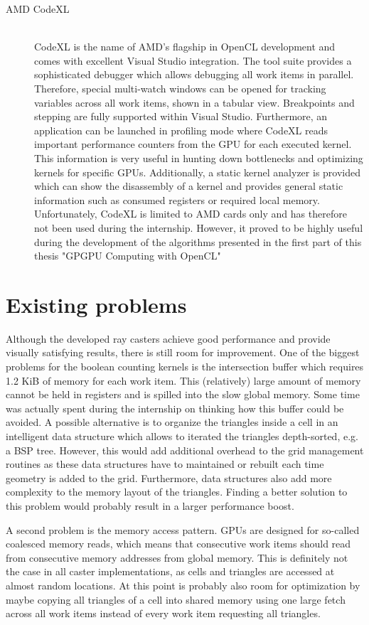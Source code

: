 \begin{description}
\item[AMD CodeXL] \hfill \\
CodeXL is the name of AMD's flagship in OpenCL development and comes with excellent Visual Studio integration. The tool suite provides a sophisticated debugger which allows debugging all work items in parallel. Therefore, special multi-watch windows can be opened for tracking variables across all work items, shown in a tabular view. Breakpoints and stepping are fully supported within Visual Studio. Furthermore, an application can be launched in profiling mode where CodeXL reads important performance counters from the GPU for each executed kernel. This information is very useful in hunting down bottlenecks and optimizing kernels for specific GPUs. Additionally, a static kernel analyzer is provided which can show the disassembly of a kernel and provides general static information such as consumed registers or required local memory. Unfortunately, CodeXL is limited to AMD cards only and has therefore not been used during the internship. However, it proved to be highly useful during the development of the algorithms presented in the first part of this thesis "GPGPU Computing with OpenCL"
\end{description}

\section{Existing problems}

Although the developed ray casters achieve good performance and provide visually satisfying results, there is still room for improvement. One of the biggest problems for the boolean counting kernels is the intersection buffer which requires 1.2 KiB of memory for each work item. This (relatively) large amount of memory cannot be held in registers and is spilled into the slow global memory. Some time was actually spent during the internship on thinking how this buffer could be avoided. A possible alternative is to organize the triangles inside a cell in an intelligent data structure which allows to iterated the triangles depth-sorted, e.g. a BSP tree. However, this would add additional overhead to the grid management routines as these data structures have to maintained or rebuilt each time geometry is added to the grid. Furthermore, data structures also add more complexity to the memory layout of the triangles. Finding a better solution to this problem would probably result in a larger performance boost.

A second problem is the memory access pattern. GPUs are designed for so-called coalesced memory reads, which means that consecutive work items should read from consecutive memory addresses from global memory. This is definitely not the case in all caster implementations, as cells and triangles are accessed at almost random locations. At this point is probably also room for optimization by maybe copying all triangles of a cell  into shared memory using one large fetch across all work items instead of every work item requesting all triangles.

